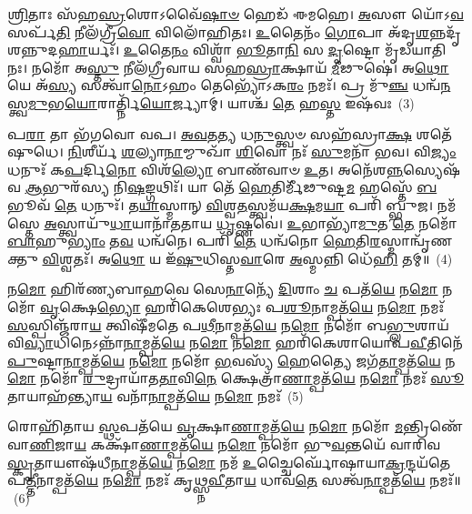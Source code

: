 \-\ul{𑌶𑍍𑌰𑌿}\-𑌤𑌾𑌃 𑌸᳴𑌹\-\ul{𑌸𑍍𑌰}\-𑌶𑍋\-𑌽𑌵𑍈᳴\-\ul{𑌷𑌾}\-\-\ul{𑍞} 𑌹𑍇𑌡᳴ 𑌈𑌮𑌹𑍇। \ul{𑌅}\-𑌸𑍗 𑌯𑍋᳴\-𑌽\-\ul{𑌵}\-𑌸𑌰𑍍𑌪᳴\-\ul{𑌤𑌿} 𑌨𑍀𑌲᳴𑌗𑍍𑌰𑍀\-\ul{𑌵𑍋} 𑌵𑌿𑌲𑍋᳴𑌹𑌿𑌤𑌃। \ul{𑌉}\-𑌤𑍈𑌨𑌂᳴ \ul{𑌗𑍋}\-𑌪𑌾 𑌅᳴𑌦𑍃\-\ul{𑌶}\-𑌨𑍍𑌨𑌦𑍃᳴𑌶𑌨𑍍𑌨𑍁𑌦\-\ul{𑌹𑌾}\-𑌰𑍍𑌯𑌃᳴। \ul{𑌉}\-𑌤𑍈\-\ul{𑌨𑌂} 𑌵𑌿𑌶𑍍𑌵𑌾᳴ \ul{𑌭𑍂}\-𑌤𑌾\-\ul{𑌨𑌿} 𑌸 \ul{𑌦𑍃}\-𑌷𑍍𑌟𑍋 𑌮𑍃᳴𑌡𑌯𑌾𑌤𑌿 𑌨𑌃। 𑌨𑌮𑍋᳴ 𑌅\-\ul{𑌸𑍍𑌤𑍁} 𑌨𑍀𑌲᳴𑌗𑍍𑌰𑍀𑌵𑌾𑌯 𑌸𑌹\-\ul{𑌸𑍍𑌰𑌾}\-𑌕𑍍𑌷𑌾𑌯᳴ \ul{𑌮𑍀}\-𑌢𑍁𑌷𑍇॑। 𑌅\-\ul{𑌥𑍋} 𑌯𑍇 𑌅᳴\-\ul{𑌸𑍍𑌯} 𑌸𑌤𑍍𑌵𑌾᳴\-\ul{𑌨𑍋}\-\-𑌽𑌹𑌂 𑌤𑍇𑌭𑍍𑌯𑍋᳴\-𑌽𑌕\-\ul{𑌰𑌂} 𑌨𑌮𑌃᳴। 𑌪𑍍𑌰 𑌮𑍁᳴\-\ul{𑌞𑍍𑌚} 𑌧𑌨𑍍𑌵᳴\-\ul{𑌨}\-𑌸𑍍𑌤𑍍𑌵\-\ul{𑌮𑍁}\-𑌭\-\ul{𑌯𑍋}\-𑌰𑌾𑌰𑍍𑌤𑍍𑌨𑌿᳴\-\ul{𑌯𑍋}\-𑌰𑍍𑌜𑍍𑌯𑌾𑌮𑍍। 𑌯𑌾𑌶𑍍𑌚᳴ \ul{𑌤𑍇} 𑌹\-\ul{𑌸𑍍𑌤} 𑌇𑌷᳴𑌵𑌃~(3)

𑌪\-\ul{𑌰𑌾} 𑌤𑌾 𑌭᳴𑌗𑌵𑍋 𑌵𑌪। \ul{𑌅}\-\-\ul{𑌵}\-𑌤\-\ul{𑌤𑍍𑌯} 𑌧\-\ul{𑌨𑍁}\-𑌸𑍍𑌤𑍍𑌵𑍞 𑌸𑌹᳴𑌸𑍍𑌰𑌾\-\ul{𑌕𑍍𑌷} 𑌶𑌤𑍇᳴𑌷𑍁𑌧𑍇। \ul{𑌨𑌿}\-𑌶𑍀𑌰𑍍𑌯᳴ \ul{𑌶}\-𑌲𑍍𑌯𑌾\-\ul{𑌨𑌾}\-𑌮𑍍𑌮𑍁𑌖𑌾᳴ \ul{𑌶𑌿}\-𑌵𑍋 𑌨𑌃᳴ \ul{𑌸𑍁}\-𑌮𑌨𑌾᳴ 𑌭𑌵। 𑌵𑌿\-\ul{𑌜𑍍𑌯𑌂} 𑌧𑌨𑍁𑌃᳴ 𑌕\-\ul{𑌪}\-𑌰𑍍𑌦𑌿\-\ul{𑌨𑍋} 𑌵𑌿𑌶᳴\-\ul{𑌲𑍍𑌯𑍋} 𑌬𑌾𑌣᳴𑌵𑌾𑍞 \ul{𑌉}\-𑌤। 𑌅𑌨𑍇᳴𑌶\-\ul{𑌨𑍍𑌨}\-𑌸𑍍𑌯𑍇𑌷᳴𑌵 \ul{𑌆}\-𑌭𑍁𑌰᳴𑌸𑍍𑌯 𑌨𑌿\-\ul{𑌷}\-𑌙𑍍𑌗𑌥𑌿𑌃᳴। 𑌯𑌾 𑌤𑍇᳴ \ul{𑌹𑍇}\-𑌤𑌿𑌰𑍍𑌮𑍀᳴𑌢𑍁𑌷𑍍𑌟\-\ul{𑌮} 𑌹𑌸𑍍𑌤𑍇᳴ \ul{𑌬}\-𑌭𑍂𑌵᳴ \ul{𑌤𑍇} 𑌧𑌨𑍁𑌃᳴। 𑌤\-\ul{𑌯𑌾}\-𑌸𑍍𑌮𑌾𑌨𑍍 \ul{𑌵𑌿}\-𑌶𑍍𑌵\-\ul{𑌤}\-𑌸𑍍𑌤𑍍𑌵𑌮᳴𑌯\-\ul{𑌕𑍍𑌷}\-𑌮\-\ul{𑌯𑌾} 𑌪𑌰𑌿᳴ 𑌬𑍍𑌭𑍁𑌜। 𑌨𑌮᳴𑌸𑍍𑌤𑍇 \ul{𑌅}\-𑌸𑍍𑌤𑍍𑌵𑌾𑌯𑍁᳴\-\ul{𑌧𑌾}\-𑌯𑌾𑌨𑌾᳴𑌤𑌤𑌾𑌯 \ul{𑌧𑍃}\-𑌷𑍍𑌣𑌵𑍇॑। \ul{𑌉}\-𑌭𑌾𑌭𑍍𑌯𑌾᳴\-\ul{𑌮𑍁}\-𑌤 \ul{𑌤𑍇} 𑌨𑌮𑍋᳴ \ul{𑌬𑌾}\-𑌹𑍁\-\ul{𑌭𑍍𑌯𑌾𑌂} 𑌤\-\ul{𑌵} 𑌧𑌨𑍍𑌵᳴𑌨𑍇। 𑌪𑌰𑌿᳴ \ul{𑌤𑍇} 𑌧𑌨𑍍𑌵᳴𑌨𑍋 \ul{𑌹𑍇}\-𑌤𑌿\-\ul{𑌰}\-𑌸𑍍𑌮𑌾𑌨𑍍𑌵𑍃᳴𑌣𑌕𑍍𑌤𑍁 \ul{𑌵𑌿}\-𑌶𑍍𑌵𑌤𑌃᳴। 𑌅\-\ul{𑌥𑍋} 𑌯 𑌇᳴\-\ul{𑌷𑍁}\-𑌧𑌿𑌸𑍍𑌤\-\ul{𑌵𑌾}\-𑌰𑍇 \ul{𑌅}\-𑌸𑍍𑌮𑌨𑍍𑌨𑌿 𑌧𑍇᳴\-\ul{𑌹𑌿} 𑌤𑌮𑍍॥~(4)

{\anuvakamend[{𑌹𑌸𑍍𑌤𑍇᳴ \ul{𑌦𑌿}\-𑌕𑍍𑌷𑍍𑌵𑌿𑌷᳴𑌵 \ul{𑌉}\-𑌭𑌾\-\ul{𑌭𑍍𑌯𑌾𑌂} 𑌦𑍍𑌵𑌾𑌵𑌿𑍞᳴𑌶𑌤𑌿𑌶𑍍𑌚}]}%

𑌨\-\ul{𑌮𑍋} 𑌹𑌿𑌰᳴𑌣𑍍𑌯𑌬𑌾𑌹𑌵𑍇 𑌸𑍇\-\ul{𑌨𑌾}\-𑌨𑍍𑌯𑍇᳴ \ul{𑌦𑌿}\-𑌶𑌾𑌂 \ul{𑌚} 𑌪𑌤᳴\-\ul{𑌯𑍇} 𑌨\-\ul{𑌮𑍋} 𑌨𑌮𑍋᳴ \ul{𑌵𑍃}\-𑌕𑍍𑌷𑍇\-\ul{𑌭𑍍𑌯𑍋} 𑌹𑌰𑌿᳴𑌕𑍇𑌶𑍇𑌭𑍍𑌯𑌃 𑌪\-\ul{𑌶𑍂}\-𑌨𑌾𑌮𑍍𑌪𑌤᳴\-\ul{𑌯𑍇} 𑌨\-\ul{𑌮𑍋} 𑌨𑌮𑌃᳴ \ul{𑌸}\-𑌸𑍍𑌪𑌿𑌞𑍍𑌜᳴𑌰𑌾\-\ul{𑌯} 𑌤𑍍𑌵𑌿𑌷𑍀᳴𑌮𑌤𑍇 𑌪\-\ul{𑌥𑍀}\-𑌨𑌾𑌮𑍍𑌪𑌤᳴\-\ul{𑌯𑍇} 𑌨\-\ul{𑌮𑍋} 𑌨𑌮𑍋᳴ 𑌬\-\ul{𑌭𑍍𑌲𑍁}\-𑌶𑌾𑌯᳴ 𑌵𑌿\-\ul{𑌵𑍍𑌯𑌾}\-𑌧𑌿𑌨𑍇\-𑌽𑌨𑍍𑌨𑌾᳴\-\ul{𑌨𑌾}\-𑌮𑍍𑌪𑌤᳴\-\ul{𑌯𑍇} 𑌨\-\ul{𑌮𑍋} 𑌨\-\ul{𑌮𑍋} 𑌹𑌰𑌿᳴𑌕𑍇𑌶𑌾𑌯𑍋𑌪\-\ul{𑌵𑍀}\-𑌤𑌿𑌨𑍇᳴ \ul{𑌪𑍁}\-𑌷𑍍𑌟𑌾\-\ul{𑌨𑌾}\-𑌮𑍍𑌪𑌤᳴\-\ul{𑌯𑍇} 𑌨\-\ul{𑌮𑍋} 𑌨𑌮𑍋᳴ \ul{𑌭}\-𑌵𑌸𑍍𑌯᳴ \ul{𑌹𑍇}\-𑌤𑍍𑌯𑍈 𑌜𑌗᳴\-\ul{𑌤𑌾}\-𑌮𑍍𑌪𑌤᳴\-\ul{𑌯𑍇} 𑌨\-\ul{𑌮𑍋} 𑌨𑌮𑍋᳴ \ul{𑌰𑍁}\-𑌦𑍍𑌰𑌾𑌯𑌾᳴𑌤\-\ul{𑌤𑌾}\-𑌵𑌿\-\ul{𑌨𑍇} 𑌕𑍍𑌷𑍇𑌤𑍍𑌰𑌾᳴\-\ul{𑌣𑌾}\-𑌮𑍍𑌪𑌤᳴\-\ul{𑌯𑍇} 𑌨\-\ul{𑌮𑍋} 𑌨𑌮𑌃᳴ \ul{𑌸𑍂}\-𑌤𑌾𑌯𑌾𑌹᳴𑌨𑍍𑌤𑍍𑌯𑌾\-\ul{𑌯} 𑌵𑌨𑌾᳴\-\ul{𑌨𑌾}\-𑌮𑍍𑌪𑌤᳴\-\ul{𑌯𑍇} 𑌨\-\ul{𑌮𑍋} 𑌨𑌮𑌃᳴~(5)

𑌰𑍋𑌹𑌿᳴𑌤𑌾𑌯 \ul{𑌸𑍍𑌥}\-𑌪𑌤᳴𑌯𑍇 \ul{𑌵𑍃}\-𑌕𑍍𑌷𑌾\-\ul{𑌣𑌾}\-𑌮𑍍𑌪𑌤᳴\-\ul{𑌯𑍇} 𑌨\-\ul{𑌮𑍋} 𑌨𑌮𑍋᳴ \ul{𑌮}\-𑌨𑍍𑌤𑍍𑌰𑌿𑌣𑍇᳴ 𑌵𑌾\-\ul{𑌣𑌿}\-𑌜𑌾\-\ul{𑌯} 𑌕𑌕𑍍𑌷𑌾᳴\-\ul{𑌣𑌾}\-𑌮𑍍𑌪𑌤᳴\-\ul{𑌯𑍇} 𑌨\-\ul{𑌮𑍋} 𑌨𑌮𑍋᳴ 𑌭𑍁\-\ul{𑌵}\-𑌨𑍍𑌤𑌯𑍇᳴ 𑌵𑌾𑌰𑌿𑌵\-\ul{𑌸𑍍𑌕𑍃}\-𑌤𑌾𑌯𑍗𑌷᳴𑌧𑍀\-\ul{𑌨𑌾}\-𑌮𑍍𑌪𑌤᳴\-\ul{𑌯𑍇} 𑌨\-\ul{𑌮𑍋} 𑌨𑌮᳴ \ul{𑌉}\-𑌚𑍍𑌚𑍈𑌰𑍍𑌘𑍋᳴𑌷𑌾𑌯𑌾\-\ul{𑌕𑍍𑌰}\-𑌨𑍍𑌦𑌯᳴𑌤𑍇 𑌪\-\ul{𑌤𑍍𑌤𑍀}\-𑌨𑌾𑌮𑍍𑌪𑌤᳴\-\ul{𑌯𑍇} 𑌨\-\ul{𑌮𑍋} 𑌨𑌮𑌃᳴ 𑌕𑍃𑌥𑍍𑌸𑍍𑌨\-\ul{𑌵𑍀}\-𑌤𑌾\-\ul{𑌯} 𑌧𑌾𑌵᳴\-\ul{𑌤𑍇} 𑌸𑌤𑍍𑌵᳴\-\ul{𑌨𑌾}\-𑌮𑍍𑌪𑌤᳴\-\ul{𑌯𑍇} 𑌨𑌮𑌃᳴॥~(6)

